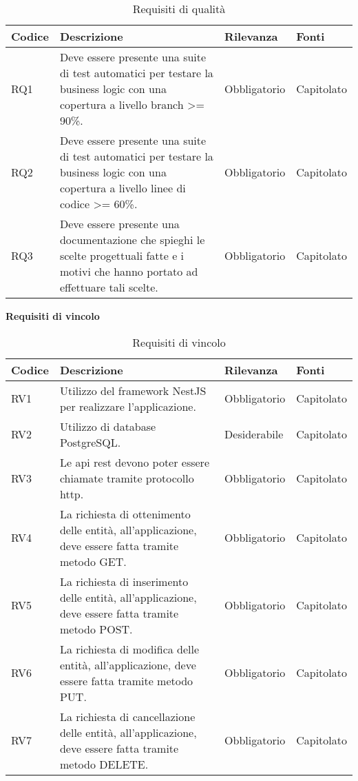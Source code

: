\begin{table}[H]
    \begin{tabular}{|p{1cm}|p{6cm}|p{1.9cm}|p{1.8cm}|} 
    \hline
    Codice & Descrizione & Rilevanza &  Fonti \\ 
    \hline
    RQ1 & Deve essere presente una suite di test automatici per testare la business logic con una copertura a livello branch
        >= 90\%. & Obbligatorio & Capitolato \\ 
    \hline
    RQ2 & Deve essere presente una suite di test automatici per testare la business logic con una copertura a livello linee
        di codice >= 60\%. & Obbligatorio & Capitolato \\ 
    \hline
    RQ3 & Deve essere presente una documentazione che spieghi le scelte progettuali fatte e i motivi che hanno portato ad effettuare
        tali scelte. & Obbligatorio & Capitolato \\ 
    \hline
    \end{tabular}
    \caption{Requisiti di qualità}
\end{table}
\clearpage
\leavevmode\newline
\textbf{Requisiti di vincolo}

\begin{table}[H]
    \begin{tabular}{|p{1cm}|p{6cm}|p{1.9cm}|p{1.8cm}|} 
    \hline
    Codice & Descrizione & Rilevanza &  Fonti \\ 
    \hline
    RV1 & Utilizzo del framework NestJS per realizzare l'applicazione. & Obbligatorio & Capitolato \\ 
    \hline
    RV2 & Utilizzo di database PostgreSQL. & Desiderabile & Capitolato \\ 
    \hline
    RV3 & Le \gls{api} \gls{rest} devono poter essere chiamate tramite protocollo \gls{http}. & Obbligatorio & Capitolato \\ 
    \hline
    RV4 & La richiesta di ottenimento delle entità, all'applicazione, deve essere fatta tramite metodo GET. & 
        Obbligatorio & Capitolato \\ 
    \hline
    RV5 & La richiesta di inserimento delle entità, all'applicazione, deve essere fatta tramite metodo POST. & 
        Obbligatorio & Capitolato \\ 
    \hline
    RV6 & La richiesta di modifica delle entità, all'applicazione, deve essere fatta tramite metodo PUT. & 
        Obbligatorio & Capitolato \\ 
    \hline
    RV7 & La richiesta di cancellazione delle entità, all'applicazione, deve essere fatta tramite metodo DELETE. & 
        Obbligatorio & Capitolato \\ 
    \hline
    \end{tabular}
    \caption{Requisiti di vincolo}
\end{table}